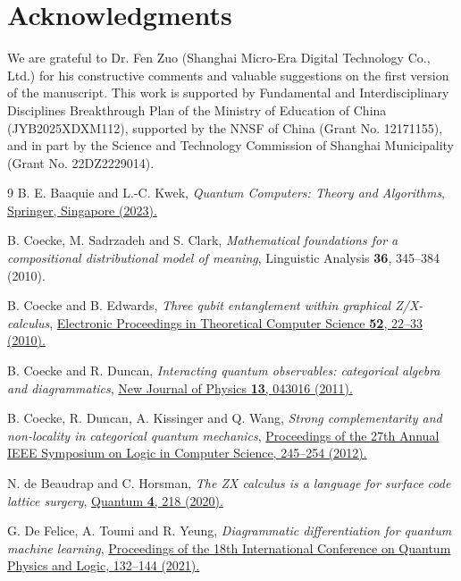 \documentclass[a4paper,twocolumn,11pt,unpublished]{quantumarticle}
\numberwithin{equation}{section}
\begin{document}
\section*{\textbf{Acknowledgments}}
We are grateful to Dr. Fen Zuo (Shanghai Micro-Era Digital Technology Co., Ltd.) for his constructive comments and valuable suggestions on the first version of the manuscript. This work is supported by Fundamental and Interdisciplinary Disciplines Breakthrough Plan of the Ministry of Education of China (JYB2025XDXM112),
		supported by the NNSF of China (Grant No. 12171155), and in part by the Science and Technology Commission of Shanghai Municipality (Grant No. 22DZ2229014).

\begin{thebibliography}{9}
B. E. Baaquie and L.-C. Kwek, \textit{Quantum Computers: Theory and Algorithms}, \href{https://doi.org/10.1007/978-981-19-7517-2}{Springer, Singapore (2023).}

B. Coecke, M. Sadrzadeh and S. Clark, \textit{Mathematical foundations for a compositional distributional model of meaning}, Linguistic Analysis \textbf{36}, 345--384 (2010).

B. Coecke and B. Edwards, \textit{Three qubit entanglement within graphical Z/X-calculus}, \href{https://doi.org/10.48550/arXiv.1103.2811}{Electronic Proceedings in Theoretical Computer Science \textbf{52}, 22--33 (2010).}

B. Coecke and R. Duncan, \textit{Interacting quantum observables: categorical algebra and diagrammatics}, \href{https://doi.org/10.1088/1367-2630/13/4/043016}{New Journal of Physics \textbf{13}, 043016 (2011).}

B. Coecke, R. Duncan, A. Kissinger and Q. Wang, \textit{Strong complementarity and non-locality in categorical quantum mechanics}, \href{https://doi.org/10.1109/LICS.2012.35}{Proceedings of the 27th Annual IEEE Symposium on Logic in Computer Science, 245--254 (2012).}

N. de Beaudrap and C. Horsman, \textit{The ZX calculus is a language for surface code lattice surgery}, \href{https://ar5iv.labs.arxiv.org/html/1704.08670}{Quantum \textbf{4}, 218 (2020).}

G. De Felice, A. Toumi and R. Yeung, \textit{Diagrammatic differentiation for quantum machine learning}, \href{https://arxiv.org/pdf/2103.07960}{Proceedings of the 18th International Conference on Quantum Physics and Logic, 132--144 (2021).}


\end{thebibliography}
\end{document}
